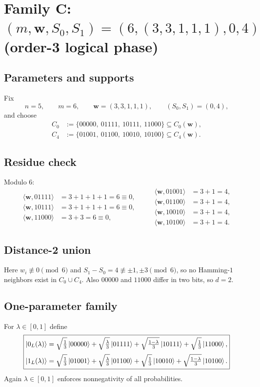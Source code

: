 \documentclass[11pt]{article}
\begin{document}
\section{Family C: $(m,\mathbf w,S_0,S_1)=(6,(3,3,1,1,1),0,4)$ (order-3 logical phase)}

\subsection{Parameters and supports}
Fix
\[
n=5,\qquad m=6,\qquad \mathbf w=(3,3,1,1,1),\qquad (S_0,S_1)=(0,4),
\]
and choose
\[
\begin{aligned}
C_0&:=\{00000,\ 01111,\ 10111,\ 11000\}\subseteq C_0(\mathbf w),\\
C_4&:=\{01001,\ 01100,\ 10010,\ 10100\}\subseteq C_4(\mathbf w).
\end{aligned}
\]

\subsection{Residue check}
Modulo $6$:
\[
\begin{aligned}
\langle \mathbf w,01111\rangle&=3+1+1+1=6\equiv 0,\\
\langle \mathbf w,10111\rangle&=3+1+1+1=6\equiv 0,\\
\langle \mathbf w,11000\rangle&=3+3=6\equiv 0,
\end{aligned}
\qquad
\begin{aligned}
\langle \mathbf w,01001\rangle&=3+1=4,\\
\langle \mathbf w,01100\rangle&=3+1=4,\\
\langle \mathbf w,10010\rangle&=3+1=4,\\
\langle \mathbf w,10100\rangle&=3+1=4.
\end{aligned}
\]

\subsection{Distance-2 union}
Here $w_i\not\equiv 0\pmod 6$ and $S_1-S_0=4\not\equiv \pm 1,\pm 3\pmod 6$,
so no Hamming-$1$ neighbors exist in $C_0\cup C_4$. Also $00000$ and $11000$ differ in two bits, so $d=2$.

\subsection{One-parameter family}
For $\lambda\in[0,1]$ define
\[
\boxed{
\begin{aligned}
\ket{0_L(\lambda)}
&=
\sqrt{\tfrac13}\ket{00000}
+\sqrt{\tfrac{\lambda}{3}}\ket{01111}
+\sqrt{\tfrac{1-\lambda}{3}}\ket{10111}
+\sqrt{\tfrac13}\ket{11000},\\[2pt]
\ket{1_L(\lambda)}
&=
\sqrt{\tfrac13}\ket{01001}
+\sqrt{\tfrac{\lambda}{3}}\ket{01100}
+\sqrt{\tfrac13}\ket{10010}
+\sqrt{\tfrac{1-\lambda}{3}}\ket{10100}.
\end{aligned}}
\]
Again $\lambda\in[0,1]$ enforces nonnegativity of all probabilities.
\end{document}
